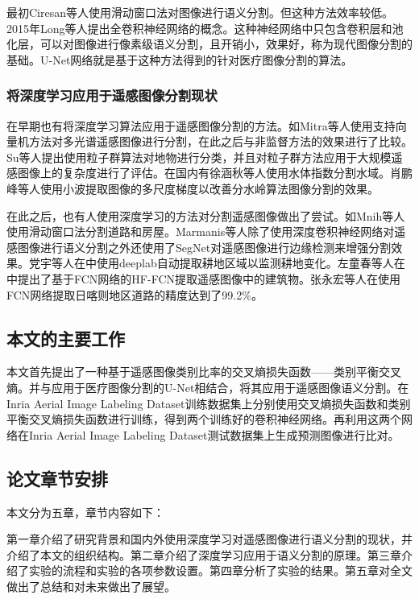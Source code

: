 最初Ciresan等人\cite{ciresan2012deep}使用滑动窗口法对图像进行语义分割。但这种方法效率较低。2015年Long等人\cite{long2015fully}提出全卷积神经网络的概念。这种神经网络中只包含卷积层和池化层，可以对图像进行像素级语义分割，且开销小，效果好，称为现代图像分割的基础。U-Net网络就是基于这种方法得到的针对医疗图像分割的算法。

\subsubsection{将深度学习应用于遥感图像分割现状}
在早期也有将深度学习算法应用于遥感图像分割的方法。如Mitra等人使用支持向量机方法对多光谱遥感图像进行分割，在此之后与非监督方法的效果进行了比较\cite{mitra2004segmentation}。Su等人提出使用粒子群算法对地物进行分类，并且对粒子群方法应用于大规模遥感图像上的复杂度进行了评估\cite{su2014optimized}。在国内有徐涵秋等人\cite{徐涵秋2005利用改进的归一化差异水体指数}使用水体指数分割水域。肖鹏峰等人\cite{肖鹏峰2007基于相位一致的高分辨率遥感图像分割方法}使用小波提取图像的多尺度梯度以改善分水岭算法图像分割的效果。

在此之后，也有人使用深度学习的方法对分割遥感图像做出了尝试。如Mnih等人使用滑动窗口法分割道路和房屋\cite{mnih2013machine}。Marmanis等人\cite{marmanis2018classification}除了使用深度卷积神经网络对遥感图像进行语义分割之外还使用了SegNet对遥感图像进行边缘检测来增强分割效果。党宇等人在\cite{党宇2017基于深度学习}中使用deeplab自动提取耕地区域以监测耕地变化。左童春等人在\cite{左童春2017基于高分辨率}中提出了基于FCN网络的HF-FCN提取遥感图像中的建筑物。张永宏等人在\cite{张永宏2018基于全卷积神经网络的多源高分辨率遥感道路提取}使用FCN网络提取日喀则地区道路的精度达到了99.2\%。
\subsection{本文的主要工作}
本文首先提出了一种基于遥感图像类别比率的交叉熵损失函数——类别平衡交叉熵。并与应用于医疗图像分割的U-Net相结合，将其应用于遥感图像语义分割。在Inria Aerial Image Labeling Dataset训练数据集上分别使用交叉熵损失函数和类别平衡交叉熵损失函数进行训练，得到两个训练好的卷积神经网络。再利用这两个网络在Inria Aerial Image Labeling Dataset测试数据集上生成预测图像进行比对。
\subsection{论文章节安排}
本文分为五章，章节内容如下：

第一章介绍了研究背景和国内外使用深度学习对遥感图像进行语义分割的现状，并介绍了本文的组织结构。第二章介绍了深度学习应用于语义分割的原理。第三章介绍了实验的流程和实验的各项参数设置。第四章分析了实验的结果。第五章对全文做出了总结和对未来做出了展望。